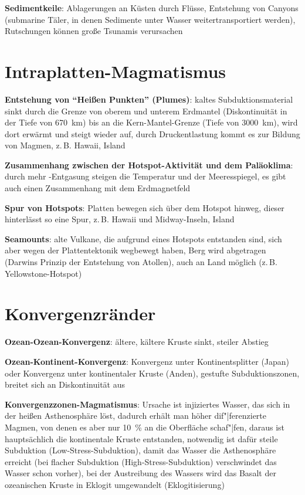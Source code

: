 \textbf{Sedimentkeile}:
Ablagerungen an Küsten durch Flüsse,
Entstehung von Canyons (submarine Täler, in denen Sedimente unter Wasser weitertransportiert
werden),
Rutschungen können große Tsunamis verursachen

\section{%
    Intraplatten-Magmatismus%
}

\textbf{Entstehung von "`Heißen Punkten"' (Plumes)}:
kaltes Subduktionsmaterial sinkt durch die Grenze von oberem und unterem Erdmantel
(Diskontinuität in der Tiefe von \SI{670}{\kilo\meter}) bis an die Kern-Mantel-Grenze
(Tiefe von \SI{3000}{\kilo\meter}), wird dort erwärmt und steigt wieder auf,
durch Druckentlastung kommt es zur Bildung von Magmen,
z.\,B. Hawaii, Island

\textbf{Zusammenhang zwischen der Hotspot-Aktivität und dem Paläoklima}:
durch mehr -Entgasung steigen die Temperatur und der Meeresspiegel,
es gibt auch einen Zusammenhang mit dem Erdmagnetfeld

\textbf{Spur von Hotspots}:
Platten bewegen sich über dem Hotspot hinweg,
dieser hinterlässt so eine Spur,
z.\,B. Hawaii und Midway-Inseln, Island

\textbf{Seamounts}:
alte Vulkane, die aufgrund eines Hotspots entstanden sind, sich aber wegen der Plattentektonik
wegbewegt haben,
Berg wird abgetragen (Darwins Prinzip der Entstehung von Atollen),
auch an Land möglich (z.\,B. Yellowstone-Hotspot)

\pagebreak

\section{%
    Konvergenzränder%
}

\textbf{Ozean-Ozean-Konvergenz}:
ältere, kältere Kruste sinkt, steiler Abstieg

\textbf{Ozean-Kontinent-Konvergenz}:
Konvergenz unter Kontinentsplitter (Japan) oder Konvergenz unter kontinentaler Kruste (Anden),
gestufte Subduktionszonen, breitet sich an Diskontinuität aus

\textbf{Konvergenzzonen-Magmatismus}:
Ursache ist injiziertes Wasser, das sich in der heißen Asthenosphäre löst,
dadurch erhält man höher dif"|ferenzierte Magmen, von denen es aber nur \SI{10}{\percent}
an die Oberfläche schaf"|fen,
daraus ist hauptsächlich die kontinentale Kruste entstanden,
notwendig ist dafür steile Subduktion
(Low-Stress-Subduktion), damit das Wasser die Asthenosphäre erreicht
(bei flacher Subduktion (High-Stress-Subduktion) verschwindet das Wasser schon vorher),
bei der Austreibung des Wassers wird das Basalt der ozeanischen Kruste in Eklogit umgewandelt
(Eklogitisierung)

